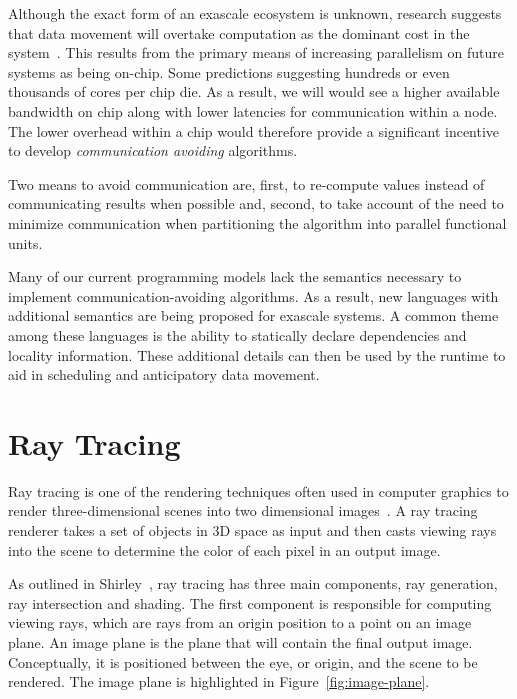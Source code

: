 Although the exact form of an exascale ecosystem is unknown, research
suggests that data movement will overtake computation as the dominant
cost in the system~\cite{article-kogge}.  This results from the primary
means of increasing parallelism on future systems as being on-chip.  Some
predictions suggesting hundreds or even thousands of cores per chip die.
As a result, we will would see a higher available bandwidth on
chip along with lower latencies for communication within a node. The
lower overhead within a chip would therefore provide a significant incentive to
develop \emph{communication avoiding} algorithms.

Two means to avoid communication are, first, to re-compute values
instead of communicating results when possible and, second, to take
account of the need to minimize communication when partitioning the
algorithm into parallel functional units.

Many of our current programming models lack the semantics necessary to
implement communication-avoiding algorithms. As a result, new
languages with additional semantics are being proposed for exascale
systems. A common theme among these languages is the ability to
statically declare dependencies and locality information.  These additional
details can then be used by the runtime to aid in scheduling and anticipatory
data movement.

\section{Ray Tracing}
\label{sec:raytracing}

Ray tracing is one of the rendering techniques often used in computer graphics 
to render three-dimensional scenes into two dimensional
images~\cite{book-shirley}.  A ray tracing renderer takes a set of
objects in 3D space as input and then casts viewing rays into the scene to
determine the color of each pixel in an output image.  

As outlined in Shirley~\cite{book-shirley}, ray tracing has
three main components, ray generation, ray intersection and shading.  The first
component is responsible for computing viewing rays, which are rays from an
origin position to a point on an image plane.  An image plane is the plane that
will contain the final output image.  Conceptually, it is positioned between the
eye, or origin, and the scene to be rendered.  The image plane is highlighted in
Figure~\ref{fig:image-plane}.

